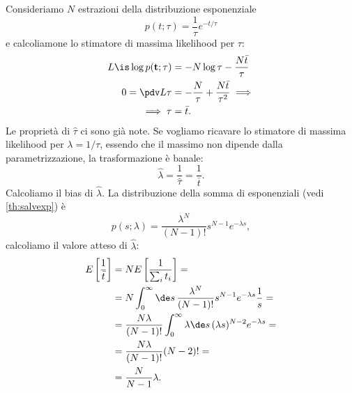 
\begin{example}
	Consideriamo $N$ estrazioni della distribuzione esponenziale
	\begin{equation*}
		p(t;\tau)
		= \frac1\tau e^{-t/\tau}
	\end{equation*}
	e calcoliamone lo stimatore di massima likelihood per $\tau$:
	\begin{align*}
		L \is \log p(\mathbf t;\tau)
		&= -N\log\tau - \frac{N\bar t}\tau \\
		0 = \pdv L\tau
		&= -\frac N\tau + \frac{N\bar t}{\tau^2} \implies \\
		\implies \tau
		&= \bar t.
	\end{align*}
	Le proprietà di $\hat\tau$ ci sono già note.
	Se vogliamo ricavare lo stimatore di massima likelihood per $\lambda=1/\tau$,
	essendo che il massimo non dipende dalla parametrizzazione,
	la trasformazione è banale:
	\begin{equation*}
		\hat\lambda = \frac1{\hat\tau} = \frac1{\bar t}.
	\end{equation*}
	Calcoliamo il bias di $\hat\lambda$.
	La distribuzione della somma di esponenziali (vedi \autoref{th:salvexp}) è
	\begin{equation*}
		p(s;\lambda)
		= \frac{\lambda^N}{(N-1)!}s^{N-1}e^{-\lambda s},
	\end{equation*}
	calcoliamo il valore atteso di $\hat\lambda$:
	\begin{align*}
		E \left[\frac1{\bar t}\right]
		&= N E \left[\frac1{\sum_i t_i}\right] = \\
		&= N \int_0^\infty \de s\, \frac{\lambda^N}{(N-1)!}s^{N-1}e^{-\lambda s} \frac 1s = \\
		&= \frac{N\lambda}{(N-1)!} \int_0^\infty \lambda\de s\, (\lambda s)^{N-2} e^{-\lambda s} = \\
		&= \frac{N\lambda}{(N-1)!} (N-2)! = \\
		&= \frac N{N-1} \lambda.
	\end{align*}
\end{example}

